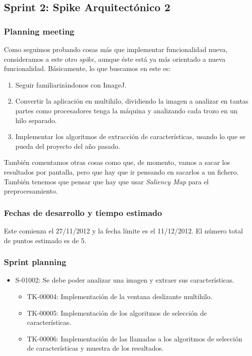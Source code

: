 \subsection{Sprint 2: Spike Arquitectónico 2}
\subsubsection*{Planning meeting}
Como seguimos probando cosas más que implementar funcionalidad nueva, consideramos a este \sprint{} otro \textit{spike}, aunque éste está ya más orientado a nueva funcionalidad. Básicamente, lo que buscamos en este \sprint{} es:

\begin{enumerate}
\item Seguir familiarizándonos con ImageJ.
\item Convertir la aplicación en multihilo, dividiendo la imagen a analizar en tantas partes como procesadores tenga la máquina y analizando cada trozo en un hilo separado.
\item Implementar los algoritmos de extracción de características, usando lo que se pueda del proyecto del año pasado.
\end{enumerate}

También comentamos otras cosas como que, de momento, vamos a sacar los resultados por pantalla, pero que hay que ir pensando en sacarlos a un fichero. También tenemos que pensar que hay que usar \textit{Saliency Map} para el preprocesamiento.

\subsubsection*{Fechas de desarrollo y tiempo estimado}
Este \sprint{} comienza el 27/11/2012 y la fecha límite es el 11/12/2012. El número total de puntos estimado es de 5.

\subsubsection*{Sprint planning}
\begin{itemize}
\item S-01002: Se debe poder analizar una imagen y extraer sus características.
	\begin{itemize}
	\item TK-00004: Implementación de la ventana deslizante multihilo.
	\item TK-00005: Implementación de los algoritmos de selección de características.
	\item TK-00006: Implementación de las llamadas a los algoritmos de selección de características y muestra de los resultados.
	\end{itemize}
\end{itemize}

